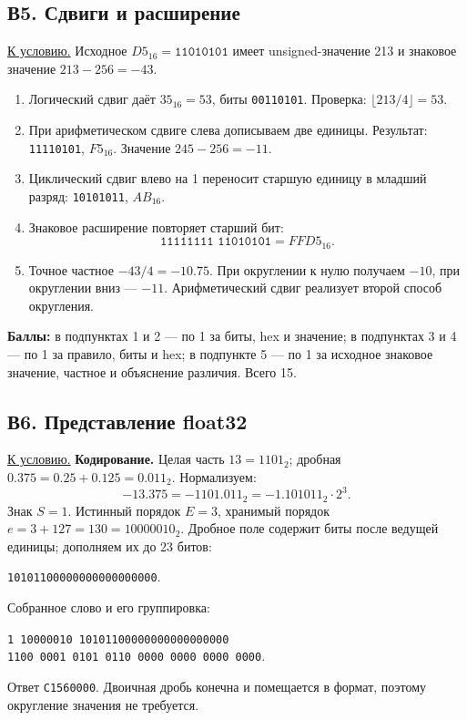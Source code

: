 \subsection*{В5. Сдвиги и расширение}\label{sol:v5}
\hyperref[task:v5]{К условию.}
Исходное $D5_{16}=\texttt{11010101}$ имеет unsigned-значение 213 и знаковое значение $213-256=-43$.
\begin{enumerate}
    \item Логический сдвиг даёт $35_{16}=53$, биты \texttt{00110101}. Проверка: $\lfloor213/4\rfloor=53$.
    \item При арифметическом сдвиге слева дописываем две единицы. Результат: \texttt{11110101}, $F5_{16}$. Значение $245-256=-11$.
    \item Циклический сдвиг влево на 1 переносит старшую единицу в младший разряд: \texttt{10101011}, $AB_{16}$.
    \item Знаковое расширение повторяет старший бит:
    \[
    \texttt{11111111 11010101}=FFD5_{16}.
    \]
    \item Точное частное $-43/4=-10.75$. При округлении к нулю получаем $-10$, при округлении вниз --- $-11$. Арифметический сдвиг реализует второй способ округления.
\end{enumerate}
\textbf{Баллы:} в подпунктах 1 и 2 --- по 1 за биты, hex и значение; в подпунктах 3 и 4 --- по 1 за правило, биты и hex; в подпункте 5 --- по 1 за исходное знаковое значение, частное и объяснение различия. Всего 15.

\subsection*{В6. Представление float32}\label{sol:v6}
\hyperref[task:v6]{К условию.}
\textbf{Кодирование.} Целая часть $13=1101_2$; дробная $0.375=0.25+0.125=0.011_2$. Нормализуем:
\[
-13.375=-1101.011_2=-1.101011_2\cdot2^3.
\]
Знак $S=1$. Истинный порядок $E=3$, хранимый порядок $e=3+127=130=10000010_2$. Дробное поле содержит биты после ведущей единицы; дополняем их до 23 битов:
\begin{center}
\texttt{10101100000000000000000}.
\end{center}
Собранное слово и его группировка:
\begin{center}
\texttt{1 10000010 10101100000000000000000}\\
\texttt{1100 0001 0101 0110 0000 0000 0000 0000}.
\end{center}
Ответ \texttt{C1560000}. Двоичная дробь конечна и помещается в формат, поэтому округление значения не требуется.

